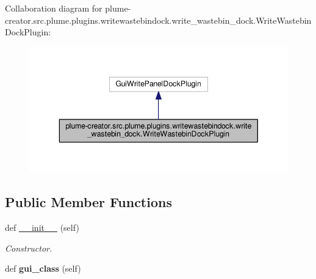 Collaboration diagram for plume-\/creator.src.\+plume.\+plugins.\+writewastebindock.\+write\+\_\+wastebin\+\_\+dock.\+Write\+Wastebin\+Dock\+Plugin\+:\nopagebreak
\begin{figure}[H]
\begin{center}
\leavevmode
\includegraphics[width=343pt]{classplume-creator_1_1src_1_1plume_1_1plugins_1_1writewastebindock_1_1write__wastebin__dock_1_1_f060a087cbb435f676d735d8ba4c9c45}
\end{center}
\end{figure}
\subsection*{Public Member Functions}
\begin{DoxyCompactItemize}
\item 
def \hyperlink{classplume-creator_1_1src_1_1plume_1_1plugins_1_1writewastebindock_1_1write__wastebin__dock_1_1_write_wastebin_dock_plugin_aabf2e730ee1b789b0e2f87924c3fe306}{\+\_\+\+\_\+init\+\_\+\+\_\+} (self)\hypertarget{classplume-creator_1_1src_1_1plume_1_1plugins_1_1writewastebindock_1_1write__wastebin__dock_1_1_write_wastebin_dock_plugin_aabf2e730ee1b789b0e2f87924c3fe306}{}\label{classplume-creator_1_1src_1_1plume_1_1plugins_1_1writewastebindock_1_1write__wastebin__dock_1_1_write_wastebin_dock_plugin_aabf2e730ee1b789b0e2f87924c3fe306}

\begin{DoxyCompactList}\small\item\em Constructor. \end{DoxyCompactList}\item 
def {\bfseries gui\+\_\+class} (self)\hypertarget{classplume-creator_1_1src_1_1plume_1_1plugins_1_1writewastebindock_1_1write__wastebin__dock_1_1_write_wastebin_dock_plugin_aaeffc2010931ed72e05bdeda4b6314b2}{}\label{classplume-creator_1_1src_1_1plume_1_1plugins_1_1writewastebindock_1_1write__wastebin__dock_1_1_write_wastebin_dock_plugin_aaeffc2010931ed72e05bdeda4b6314b2}

\end{DoxyCompactItemize}
